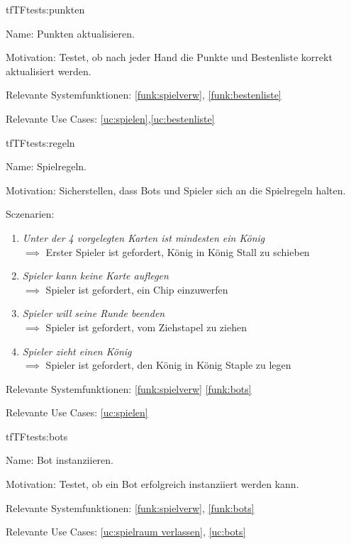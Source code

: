 \begin{description}[leftmargin=5em, style=sameline]
\begin{lhp}{tf}{TF}{tests:punkten}
	\item [Name:] Punkten aktualisieren.
	\item [Motivation:] Testet, ob nach jeder Hand die Punkte und Bestenliste korrekt aktualisiert werden. 
	\item [Relevante Systemfunktionen:] \ref{funk:spielverw}, \ref{funk:bestenliste}
	\item [Relevante Use Cases:] \ref{uc:spielen},\ref{uc:bestenliste}
\end{lhp}

\begin{lhp}{tf}{TF}{tests:regeln}
	\item [Name:] Spielregeln.
	\item [Motivation:] Sicherstellen, dass Bots und Spieler sich an die Spielregeln halten.
	\item [Sczenarien:] \hfill
		\begin{enumerate}
			\item \textit{Unter der 4 vorgelegten Karten ist mindesten ein König} \\ $\implies$  Erster Spieler ist gefordert, König in König Stall zu schieben
			\item \textit{ Spieler kann keine Karte auflegen} \\ $\implies$   Spieler ist gefordert, ein Chip einzuwerfen
			\item \textit{Spieler will seine Runde beenden} \\ $\implies$  Spieler ist gefordert, vom Ziehstapel zu ziehen
			\item \textit{Spieler zieht einen König} \\ $\implies$   Spieler ist gefordert, den König in König Staple zu legen
			
		\end{enumerate}
	\item [Relevante Systemfunktionen:] \ref{funk:spielverw} \ref{funk:bots}
	\item [Relevante Use Cases:]\ref{uc:spielen}
\end{lhp}

\begin{lhp}{tf}{TF}{tests:bots}
	\item [Name:] Bot instanziieren.
	\item [Motivation:] Testet, ob ein Bot erfolgreich instanziiert werden kann.
	\item [Relevante Systemfunktionen:] \ref{funk:spielverw}, \ref{funk:bots}
	\item [Relevante Use Cases:] \ref{uc:spielraum verlassen}, \ref{uc:bots}
\end{lhp}


\end{description}
